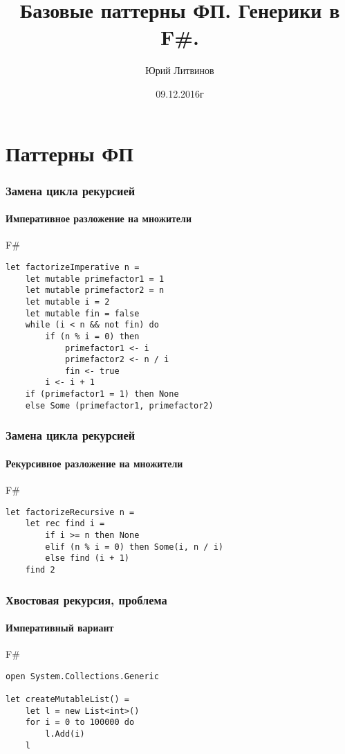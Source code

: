 \documentclass[xetex,mathserif,serif]{beamer}
\title{Базовые паттерны ФП. Генерики в F\#.}
\author{Юрий Литвинов}
\date{09.12.2016г}
\begin{document}
	
	\frame{\titlepage}
	
	\section{Паттерны ФП}

	\begin{frame}[fragile]
		\frametitle{Замена цикла рекурсией}
		\framesubtitle{Императивное разложение на множители}
		\begin{exampleblock}{F\#}
			\begin{lstlisting}
let factorizeImperative n =
    let mutable primefactor1 = 1
    let mutable primefactor2 = n
    let mutable i = 2
    let mutable fin = false
    while (i < n && not fin) do
        if (n % i = 0) then
            primefactor1 <- i
            primefactor2 <- n / i
            fin <- true
        i <- i + 1
    if (primefactor1 = 1) then None
    else Some (primefactor1, primefactor2)
\end{lstlisting}
\end{exampleblock}

\end{frame}

	\begin{frame}[fragile]
		\frametitle{Замена цикла рекурсией}
		\framesubtitle{Рекурсивное разложение на множители}
		\begin{exampleblock}{F\#}
			\begin{lstlisting}
let factorizeRecursive n =
    let rec find i =
        if i >= n then None
        elif (n % i = 0) then Some(i, n / i)
        else find (i + 1)
    find 2
\end{lstlisting}
\end{exampleblock}
		
\end{frame}

\begin{frame}[fragile]
	\frametitle{Хвостовая рекурсия, проблема}
	\framesubtitle{Императивный вариант}
	\begin{exampleblock}{F\#}
		\begin{lstlisting}
open System.Collections.Generic

let createMutableList() =
    let l = new List<int>()
    for i = 0 to 100000 do
        l.Add(i)
    l
\end{lstlisting}
\end{exampleblock}
	
\end{frame}
\end{document}
